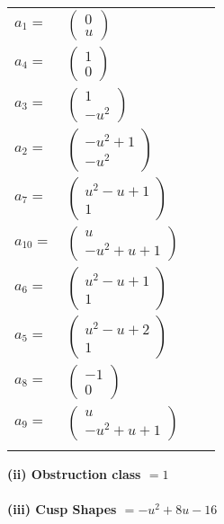 \documentclass[1p]{elsarticle_modified}
\theoremstyle{definition}
\begin{document}
\begin{tabular}{m{7pt} m{180pt} m{7pt} m{180pt} }
\flushright $a_{1}=$&$\begin{pmatrix}0\\u\end{pmatrix}$ \\
\flushright $a_{4}=$&$\begin{pmatrix}1\\0\end{pmatrix}$ \\
\flushright $a_{3}=$&$\begin{pmatrix}1\\- u^2\end{pmatrix}$ \\
\flushright $a_{2}=$&$\begin{pmatrix}- u^2+1\\- u^2\end{pmatrix}$ \\
\flushright $a_{7}=$&$\begin{pmatrix}u^2- u+1\\1\end{pmatrix}$ \\
\flushright $a_{10}=$&$\begin{pmatrix}u\\- u^2+u+1\end{pmatrix}$ \\
\flushright $a_{6}=$&$\begin{pmatrix}u^2- u+1\\1\end{pmatrix}$ \\
\flushright $a_{5}=$&$\begin{pmatrix}u^2- u+2\\1\end{pmatrix}$ \\
\flushright $a_{8}=$&$\begin{pmatrix}-1\\0\end{pmatrix}$ \\
\flushright $a_{9}=$&$\begin{pmatrix}u\\- u^2+u+1\end{pmatrix}$\\&\end{tabular}
\flushleft \textbf{(ii) Obstruction class $= 1$}\\~\\
\flushleft \textbf{(iii) Cusp Shapes $= - u^2+8 u-16$}\\~\\
\end{document}
